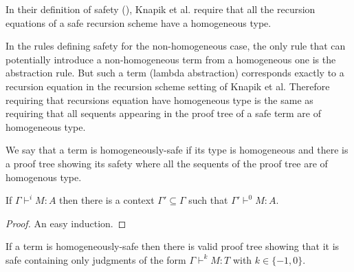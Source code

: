In their definition of safety (\cite{KNU02}), Knapik et al. require
that all the recursion equations of a safe recursion scheme have a
homogeneous type.

In the rules defining safety for the non-homogeneous case, the only
rule that can potentially introduce a non-homogeneous term from a
homogeneous one is the abstraction rule. But such a term (lambda
abstraction) corresponds exactly to a recursion equation in the
recursion scheme setting of Knapik et al. Therefore requiring that
recursions equation have homogeneous type is the same as requiring
that all sequents appearing in the proof tree of a safe term are of
homogeneous type.

We say that a term is homogeneously-safe if its type is homogeneous
and there is a proof tree showing its safety where all the sequents
of the proof tree are of homogenous type.

\begin{lem}
\label{lem:context_reduction} If $\Gamma \vdash^i M : A$ then there
is a context $\Gamma' \subseteq \Gamma$ such that $\Gamma' \vdash^0
M : A$.
\end{lem}
\begin{proof}
An easy induction.
\end{proof}


\begin{lem}
\label{lem:homog_judg_zero_minusone} If a term is homogeneously-safe
then there is valid proof tree showing that it is safe containing
only judgments of the form $\Gamma \vdash^{k} M : T$ with $k\in
\{-1,0\}$.
\end{lem}

